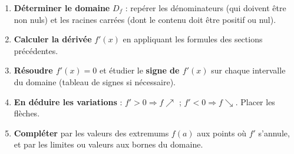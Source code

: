 \documentclass[11pt]{article}
\begin{document}
\begin{methode}
\begin{enumerate}
\item \textbf{Déterminer le domaine} $D_f$ : repérer les dénominateurs (qui doivent être non nuls) et les racines carrées (dont le contenu doit être positif ou nul).
\item \textbf{Calculer la dérivée} $f'(x)$ en appliquant les formules des sections précédentes.
\item \textbf{Résoudre $f'(x) = 0$} et étudier le \textbf{signe de $f'(x)$} sur chaque intervalle du domaine (tableau de signes si nécessaire).
\item \textbf{En déduire les variations} : $f' > 0 \Rightarrow f \nearrow$ ; $f' < 0 \Rightarrow f \searrow$. Placer les flèches.
\item \textbf{Compléter} par les valeurs des extremums $f(a)$ aux points où $f'$ s'annule, et par les limites ou valeurs aux bornes du domaine.
\end{enumerate}
\end{methode}
\end{document}
